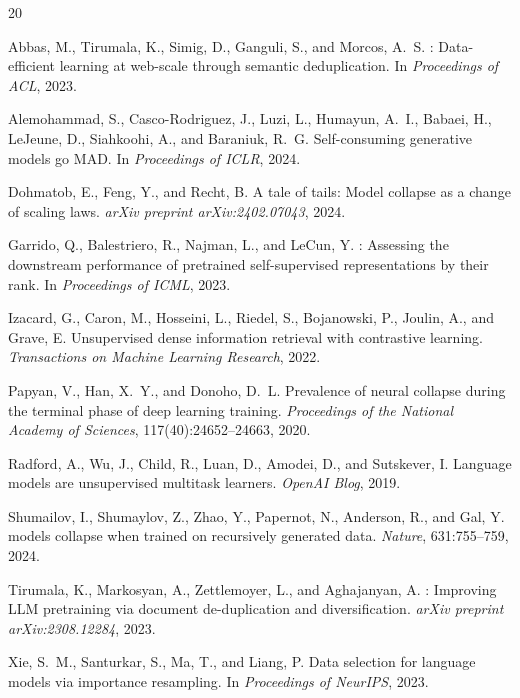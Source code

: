 \documentclass[11pt]{article}
\begin{document}
\begin{thebibliography}{20}

Abbas, M., Tirumala, K., Simig, D., Ganguli, S., and Morcos, A.~S.
: Data-efficient learning at web-scale through semantic deduplication.
\newblock In \emph{Proceedings of ACL}, 2023.

Alemohammad, S., Casco-Rodriguez, J., Luzi, L., Humayun, A.~I., Babaei, H., LeJeune, D., Siahkoohi, A., and Baraniuk, R.~G.
\newblock Self-consuming generative models go {MAD}.
\newblock In \emph{Proceedings of ICLR}, 2024.

Dohmatob, E., Feng, Y., and Recht, B.
\newblock A tale of tails: Model collapse as a change of scaling laws.
\newblock \emph{arXiv preprint arXiv:2402.07043}, 2024.

Garrido, Q., Balestriero, R., Najman, L., and LeCun, Y.
: Assessing the downstream performance of pretrained self-supervised representations by their rank.
\newblock In \emph{Proceedings of ICML}, 2023.

Izacard, G., Caron, M., Hosseini, L., Riedel, S., Bojanowski, P., Joulin, A., and Grave, E.
\newblock Unsupervised dense information retrieval with contrastive learning.
\newblock \emph{Transactions on Machine Learning Research}, 2022.

Papyan, V., Han, X.~Y., and Donoho, D.~L.
\newblock Prevalence of neural collapse during the terminal phase of deep learning training.
\newblock \emph{Proceedings of the National Academy of Sciences}, 117(40):24652--24663, 2020.

Radford, A., Wu, J., Child, R., Luan, D., Amodei, D., and Sutskever, I.
\newblock Language models are unsupervised multitask learners.
\newblock \emph{OpenAI Blog}, 2019.

Shumailov, I., Shumaylov, Z., Zhao, Y., Papernot, N., Anderson, R., and Gal, Y.
 models collapse when trained on recursively generated data.
\newblock \emph{Nature}, 631:755--759, 2024.

Tirumala, K., Markosyan, A., Zettlemoyer, L., and Aghajanyan, A.
: Improving {LLM} pretraining via document de-duplication and diversification.
\newblock \emph{arXiv preprint arXiv:2308.12284}, 2023.

Xie, S.~M., Santurkar, S., Ma, T., and Liang, P.
\newblock Data selection for language models via importance resampling.
\newblock In \emph{Proceedings of NeurIPS}, 2023.

\end{thebibliography}
\end{document}
